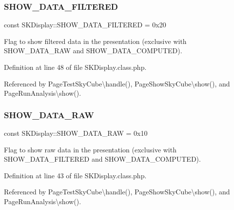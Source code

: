 \subsubsection{\texorpdfstring{S\+H\+O\+W\+\_\+\+D\+A\+T\+A\+\_\+\+F\+I\+L\+T\+E\+R\+ED}{SHOW\_DATA\_FILTERED}}
{\footnotesize\ttfamily const S\+K\+Display\+::\+S\+H\+O\+W\+\_\+\+D\+A\+T\+A\+\_\+\+F\+I\+L\+T\+E\+R\+ED = 0x20}

Flag to show filtered data in the presentation (exclusive with S\+H\+O\+W\+\_\+\+D\+A\+T\+A\+\_\+\+R\+AW and S\+H\+O\+W\+\_\+\+D\+A\+T\+A\+\_\+\+C\+O\+M\+P\+U\+T\+ED). 

Definition at line 48 of file S\+K\+Display.\+class.\+php.



Referenced by Page\+Test\+Sky\+Cube\textbackslash{}handle(), Page\+Show\+Sky\+Cube\textbackslash{}show(), and Page\+Run\+Analysis\textbackslash{}show().

\mbox{\label{class_s_k_display_a4570f138181e66ba3f3b1f5de6b49f07}} 
\subsubsection{\texorpdfstring{S\+H\+O\+W\+\_\+\+D\+A\+T\+A\+\_\+\+R\+AW}{SHOW\_DATA\_RAW}}
{\footnotesize\ttfamily const S\+K\+Display\+::\+S\+H\+O\+W\+\_\+\+D\+A\+T\+A\+\_\+\+R\+AW = 0x10}

Flag to show raw data in the presentation (exclusive with S\+H\+O\+W\+\_\+\+D\+A\+T\+A\+\_\+\+F\+I\+L\+T\+E\+R\+ED and S\+H\+O\+W\+\_\+\+D\+A\+T\+A\+\_\+\+C\+O\+M\+P\+U\+T\+ED). 

Definition at line 43 of file S\+K\+Display.\+class.\+php.



Referenced by Page\+Test\+Sky\+Cube\textbackslash{}handle(), Page\+Show\+Sky\+Cube\textbackslash{}show(), and Page\+Run\+Analysis\textbackslash{}show().

\mbox{\label{class_s_k_display_a479b2239e8fdf16b7cc0dc2f4f386d69}} 
